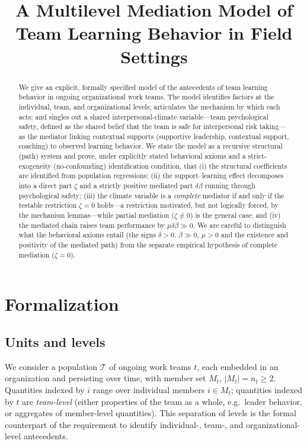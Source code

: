 \documentclass{amsart}
\theoremstyle{definition}
\theoremstyle{remark}
\begin{document}
\title{A Multilevel Mediation Model of Team Learning Behavior in Field Settings}
\maketitle

\begin{abstract}
We give an explicit, formally specified model of the antecedents of team
learning behavior in ongoing organizational work teams. The model
identifies factors at the individual, team, and organizational levels;
articulates the mechanism by which each acts; and singles out a shared
interpersonal-climate variable---team psychological safety, defined as the
shared belief that the team is safe for interpersonal risk taking---as the
mediator linking contextual supports (supportive leadership, contextual
support, coaching) to observed learning behavior. We state the model as a
recursive structural (path) system and prove, under explicitly stated
behavioral axioms and a strict-exogeneity (no-confounding) identification
condition, that (i) the structural coefficients are identified from
population regressions; (ii) the support--learning effect decomposes into a
direct part $\zeta$ and a strictly positive mediated part $\delta\beta$
running through psychological safety; (iii) the climate variable is a
\emph{complete} mediator if and only if the testable restriction $\zeta=0$
holds---a restriction motivated, but not logically forced, by the
mechanism lemmas---while partial mediation ($\zeta\neq0$) is the general
case; and (iv) the mediated chain raises team performance by
$\mu\delta\beta\gg0$. We are careful to distinguish what the behavioral
axioms entail (the signs $\delta>0$, $\beta\gg0$, $\mu>0$ and the existence
and positivity of the mediated path) from the separate empirical hypothesis
of complete mediation ($\zeta=0$).
\end{abstract}

\section{Formalization}

\subsection{Units and levels}
We consider a population $\mathcal{T}$ of ongoing work teams $t$, each
embedded in an organization and persisting over time, with member set
$M_t$, $|M_t|=n_t\ge 2$. Quantities indexed by $i$ range over individual
members $i\in M_t$; quantities indexed by $t$ are \emph{team-level}
(either properties of the team as a whole, e.g.\ leader behavior, or
aggregates of member-level quantities). This separation of levels is the
formal counterpart of the requirement to identify individual-, team-, and
organizational-level antecedents.
\end{document}
